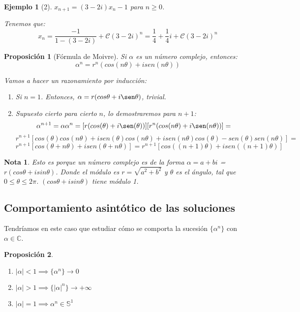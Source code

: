 \documentclass[11pt, a4paper, titlepage]{article}
\makeatletter
\renewenvironment{proof}[1][\proofname] {\vspace{-15pt}\par\pushQED{\qed}\normalfont\topsep6\p@\@plus6\p@\relax\trivlist\item[\hskip\labelsep\it#1\@addpunct{.}]\ignorespaces}{\popQED\endtrivlist\@endpefalse}
\theoremstyle{theorem-style}
\newtheorem*{nprop}{Proposición}
\theoremstyle{definition-style}
\theoremstyle{remark-style}
\newtheorem*{nota}{Nota}
\theoremstyle{example-style}
\newtheorem*{ejemplo}{Ejemplo}
\newenvironment{nlist}
{\begin{enumerate}
\renewcommand\labelenumi{(\emph{\roman{enumi})}}}
{\end{enumerate}}
\makeatother
\begin{document}
\begin{ejemplo}[2]
	$x_{n+1}=(3-2i)x_n -1$ para $n\geq 0$. 
	\begin{proof}[Solución]
	Tenemos que:
	\[
	x_n = \frac{-1}{1-(3-2i)}+\mathcal{C}(3-2i)^n = \frac{1}{4} + \frac{1}{4}i + \mathcal{C}(3-2i)^n
	\]
\end{proof}
\end{ejemplo}

\begin{nprop}[Fórmula de Moivre]
	Si $\alpha$ es un número complejo, entonces:
	\[
	\alpha^n = r^n(cos(n\theta) + i sen(n\theta))
	\]
	\begin{proof}
	Vamos a hacer un razonamiento por inducción:
	\begin{enumerate}
	\item Si $n=1$. Entonces, $\alpha = r(cos\theta +i\sen\theta)$, trivial.
	\item Supuesto cierto para cierto $n$, lo demostraremos para $n+1$:
	\[
	\alpha^{n+1} = \alpha\alpha^n =  [r(cos(\theta) +i\sen(\theta))] [r^n(cos(n\theta) +i\sen(n\theta))]=
	\]
	\[
	r^{n+1}[cos(\theta) cos(n\theta) +i sen(\theta) cos(n\theta) + isen(n\theta) cos(\theta) - sen(\theta) sen(n\theta)] = \]
	\[r^{n+1}[cos(\theta+n\theta)+isen(\theta+n\theta)] = r^{n+1}[cos((n+1)\theta)+isen((n+1)\theta)]
	\]
\end{enumerate}
	
\end{proof}
\end{nprop}

\begin{nota}
	Esto es porque un número complejo es de la forma $\alpha = a+bi$ = $r(cos\theta + i sin\theta)$.
	Donde el módulo es $r=\sqrt{a^2 + b^2}$ y $\theta$ es el ángulo, tal que $0 \leq \theta \leq 2\pi$.
	$(cos\theta + i sin\theta)$ tiene módulo 1.
	
\end{nota}

\subsection{Comportamiento asintótico de las soluciones}
Tendríamos en este caso que estudiar cómo se comporta la sucesión $\{\alpha^n\}$ con $\alpha \in \mathbb{C}$.
\begin{nprop}\hfill
\begin{nlist}
	\item $|\alpha|< 1 \implies \{\alpha^n\}\to 0$
	\item $|\alpha|> 1 \implies \{|\alpha|^n\}\to +\infty$
	\item $|\alpha| = 1 \implies \alpha^n \in \mathbb{S}^1$
\end{nlist}
	
\end{nprop}
\end{document}

